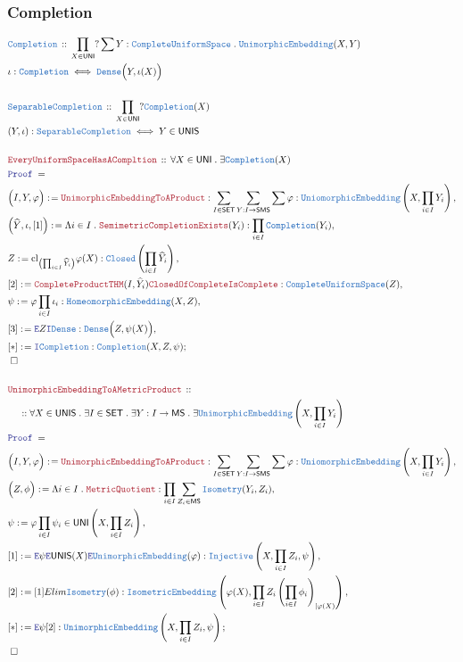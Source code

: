 \documentclass[12pt]{scrartcl}
\newcommand{\TYPE}[1]{\textcolor{NavyBlue}{\mathtt{#1}}}
\newcommand{\LOGIC}[1]{\textcolor{Blue}{\mathtt{#1}}}
\newcommand{\THM}[1]{\textcolor{Maroon}{\mathtt{#1}}}
\renewcommand{\.}{\; . \;}
\newcommand{\de}{: \kern 0.1pc =}
\newcommand{\Theorem}[2]{& \THM{#1} \, :: \, #2 \\ & \Proof = \\ }
\newcommand{\DeclareType}[2]{& \TYPE{#1} \, :: \, #2 \\}
\newcommand{\DefineType}[3]{& #1 : \TYPE{#2} \iff #3 \\}
\newcommand{\NewLine}{\\ & \kern 1pc}
\newcommand{\Page}[1]{ \begin{align*} #1 \end{align*}   }
\newcommand{\Say}[3]{& #1 \de #2 : #3, \\}
\newcommand{\SayIn}[3]{& #1 \de #2 \in #3, \\}
\newcommand{\Conclude}[3]{& #1 \de #2 : #3; \\}
\newcommand{\Intro}{\LOGIC{I}}
\newcommand{\Elim}{\LOGIC{E}}
\newcommand{\QED}{\; \square}
\newcommand{\EndProof}{& \QED \\}
\newcommand{\Proof}{\LOGIC{Proof} \; }
\newcommand{\SET}{\mathsf{SET}}
\newcommand{\Dense}{\TYPE{Dense}}
\newcommand{\Closed}{\TYPE{Closed}}
\DeclareMathOperator*{\cl}{cl}
\newcommand{\SMS}{\mathsf{SMS}}
\newcommand{\MS}{\mathsf{MS}}
\newcommand{\UNI}{\mathsf{UNI}}
\newcommand{\UNIS}{\mathsf{UNIS}}
\newcommand{\CUS}{\TYPE{CompleteUniformSpace}}
\newcommand{\Completion}{\TYPE{Completion}}
\newcommand{\SCompletion}{\TYPE{SeparableCompletion}}
\begin{document}
\subsubsection{Completion}
\Page{
	\DeclareType{Completion}{
		\prod_{X \in \UNI} 
		?\sum Y : \CUS \.
		\TYPE{UnimorphicEmbedding}(X,Y)
	}
	\DefineType{\iota}{Completion}{\Dense\Big(Y,\iota(X)\Big)}
	\\
	\DeclareType{\SCompletion}{
		\prod_{X \in \UNI} 
		?\Completion(X)
	}
	\DefineType{(Y,\iota)}{\SCompletion}{Y \in \UNIS}
	\\
	\Theorem{EveryUniformSpaceHasACompltion}
	{
		\forall X \in \UNI \.
		\exists \Completion(X)
	}
	\Say{\Big(I,Y,\varphi\Big)}{\THM{UnimorphicEmbeddingToAProduct}}
	{
		\sum_{I \in \SET} \sum_{Y : I \to \SMS} \sum 
		\varphi : \TYPE{UniomorphicEmbedding}\left( X, \prod_{i \in I} Y_i \right)
	}
	\Say{\Big(\widehat{Y},\iota,[1]\Big)}{
		\Lambda i \in I \.		
		\THM{SemimetricCompletionExists}(Y_i)
	}
	{
		\prod_{i \in I} \Completion(Y_i)
	}
	\Say{Z}{{\cl}_{\left(\prod_{i \in I}\widehat{Y}_i\right)} \varphi(X)}
	{
		\Closed\left( \prod_{i \in I} \widehat{Y}_i \right)
	}
	\Say{[2]}{
		\THM{CompleteProductTHM}(I,\widehat{Y}_i)
		\THM{ClosedOfCompleteIsComplete}
	}
	{
		\CUS(Z)
	}
	\Say{\psi}{\varphi \prod_{i \in I} \iota_i}
	{
		\TYPE{HomeomorphicEmbedding}(X,Z)
	}
	\Say{[3]}{\Elim Z \Intro \Dense}{\Dense\Big(Z, \psi(X)\Big)}
	\Conclude{[*]}{\Intro \Completion}
	{
		\Completion(X,Z,\psi)
	}
	\EndProof
	\\
	\Theorem{UnimorphicEmbeddingToAMetricProduct}
	{
		\NewLine ::		
		\forall X \in \UNIS \. 
		\exists I \in \SET \.
		\exists Y : I \to \MS \.
		\exists \TYPE{UnimorphicEmbedding}\left(X,\prod_{i \in I} Y_i\right)	
	}
	\Say{\Big(I,Y,\varphi\Big)}{\THM{UnimorphicEmbeddingToAProduct}}
	{
		\sum_{I \in \SET} \sum_{Y : I \to \SMS} \sum 
		\varphi : \TYPE{UniomorphicEmbedding}\left( X, \prod_{i \in I} Y_i \right)
	}
	\Say{\Big(Z,\phi\Big)}
	{
		\Lambda i \in I \. \THM{MetricQuotient}
	}
	{
		\prod_{i \in I} \sum_{Z_i \in \MS} \TYPE{Isometry}(Y_i,Z_i)
	}
	\SayIn{\psi}{\varphi \prod_{i \in I}\psi_i}
	{
		\UNI\left( X, \prod_{i \in I} Z_i \right)
	}
	\Say{[1]}{\Elim \psi \Elim \UNIS(X) \Elim \TYPE{UnimorphicEmbedding}(\varphi)}
	{
		\TYPE{Injective}\left( X, \prod_{i\in I} Z_i, \psi \right)
	}
	\Say{[2]}{[1]Elim \TYPE{Isometry}(\phi)}
	{
		\TYPE{IsometricEmbedding}
		\left(
			\varphi(X), 
			\prod_{i \in I} Z_i
			\left(
				\prod_{i \in I} \phi_i
			\right)_{|\varphi(X)}
		\right)
	}
	\Conclude{[*]}{\Elim \psi [2]}
	{
		\TYPE{UnimorphicEmbedding}\left( X, \prod_{i\in I} Z_i, \psi \right)
	}
	\EndProof
}
\end{document}
